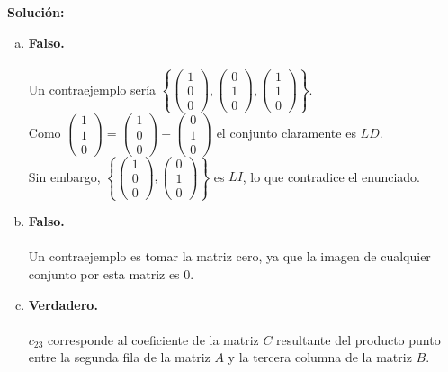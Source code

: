 \documentclass[12pt]{article}
\newenvironment{solucion}
{\begin{mdframed}[backgroundcolor=black!10]
		{\bf Solución:}\\
	}
	{
	\end{mdframed}
}
\newenvironment{preguntas}
{\begin{enumerate}\itemsep12pt
	}
	{
	\end{enumerate}
}
\begin{document}
\begin{preguntas}
\begin{solucion}
\begin{enumerate}[a)]
\item \textbf{Falso.}\\
\\
Un contraejemplo sería
$\left\{ 
\begin{pmatrix}
	1 \\ 0 \\ 0
\end{pmatrix},
\begin{pmatrix}
	0 \\ 1 \\ 0
\end{pmatrix},
\begin{pmatrix}
	1 \\ 1 \\ 0
\end{pmatrix}
\right\}$.\\
Como
$
\begin{pmatrix}
1 \\ 1 \\ 0
\end{pmatrix}
=
\begin{pmatrix}
1 \\ 0 \\ 0
\end{pmatrix}
+
\begin{pmatrix}
0 \\ 1 \\ 0
\end{pmatrix}$ el conjunto claramente es $LD$.\\
Sin embargo,
$\left\{ 
\begin{pmatrix}
1 \\ 0 \\ 0
\end{pmatrix},
\begin{pmatrix}
0 \\ 1 \\ 0
\end{pmatrix}
\right\}$ 
es $LI$, lo que contradice el enunciado.
\item  \textbf{Falso.}\\
\\
Un contraejemplo es tomar la matriz cero, ya que la imagen de cualquier conjunto por esta matriz es 0.
\item  \textbf{Verdadero.}\\
\\
$c_{23}$ corresponde al coeficiente de la matriz $C$ resultante del producto punto entre la segunda fila de la matriz $A$ y la tercera columna de la matriz $B$.\\


\end{enumerate}
\end{solucion}
\end{preguntas}
\end{document}
